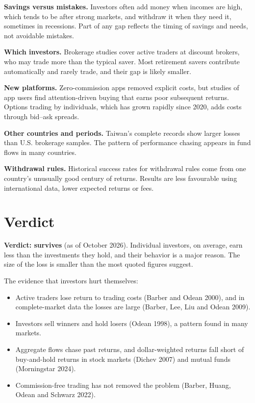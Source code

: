 \textbf{Savings versus mistakes.} Investors often add money when incomes are high, which tends to be after strong markets, and withdraw it when they need it, sometimes in recessions. Part of any gap reflects the timing of savings and needs, not avoidable mistakes.

\textbf{Which investors.} Brokerage studies cover active traders at discount brokers, who may trade more than the typical saver. Most retirement savers contribute automatically and rarely trade, and their gap is likely smaller.

\textbf{New platforms.} Zero-commission apps removed explicit costs, but studies of app users find attention-driven buying that earns poor subsequent returns. Options trading by individuals, which has grown rapidly since 2020, adds costs through bid--ask spreads.

\textbf{Other countries and periods.} Taiwan's complete records show larger losses than U.S. brokerage samples. The pattern of performance chasing appears in fund flows in many countries.

\textbf{Withdrawal rules.} Historical success rates for withdrawal rules come from one country's unusually good century of returns. Results are less favourable using international data, lower expected returns or fees.

\section{Verdict}
\label{sec:24-verdict}

\begin{callout}
\textbf{Verdict: survives} (as of October 2026). Individual investors, on average, earn less than the investments they hold, and their behavior is a major reason. The size of the loss is smaller than the most quoted figures suggest.
\end{callout}

The evidence that investors hurt themselves:

\begin{itemize}
  \item Active traders lose return to trading costs (Barber and Odean 2000), and in complete-market data the losses are large (Barber, Lee, Liu and Odean 2009).
  \item Investors sell winners and hold losers (Odean 1998), a pattern found in many markets.
  \item Aggregate flows chase past returns, and dollar-weighted returns fall short of buy-and-hold returns in stock markets (Dichev 2007) and mutual funds (Morningstar 2024).
  \item Commission-free trading has not removed the problem (Barber, Huang, Odean and Schwarz 2022).
\end{itemize}

